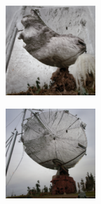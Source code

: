 \documentclass{article}
\begin{document}
\begin{figure}
\begin{subfigure}[b]{0.5\linewidth}
\begin{subfigure}[b]{0.242\linewidth}
        \end{subfigure}
        \begin{subfigure}[b]{0.242\linewidth}
        \includegraphics[width=\linewidth]{figures/imagenet128/solver_samples/imagenet128_fm_ot_46_20.png}
        \end{subfigure}
        \begin{subfigure}[b]{0.242\linewidth}
        \includegraphics[width=\linewidth]{figures/imagenet128/solver_samples/imagenet128_fm_ot_46_50.png}
        \end{subfigure}
    \end{subfigure}\\
    

\end{figure}
\end{document}
